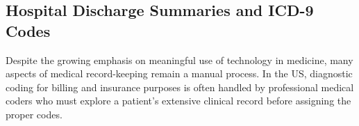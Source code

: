


\subsection{Hospital Discharge Summaries and ICD-9 Codes}

 Despite the growing emphasis on meaningful
use of technology in medicine, many aspects of medical record-keeping
remain a manual process. In the US, diagnostic coding for billing and insurance
purposes is often handled by professional medical coders who must
explore a patient's extensive clinical record before assigning the
proper codes. %



